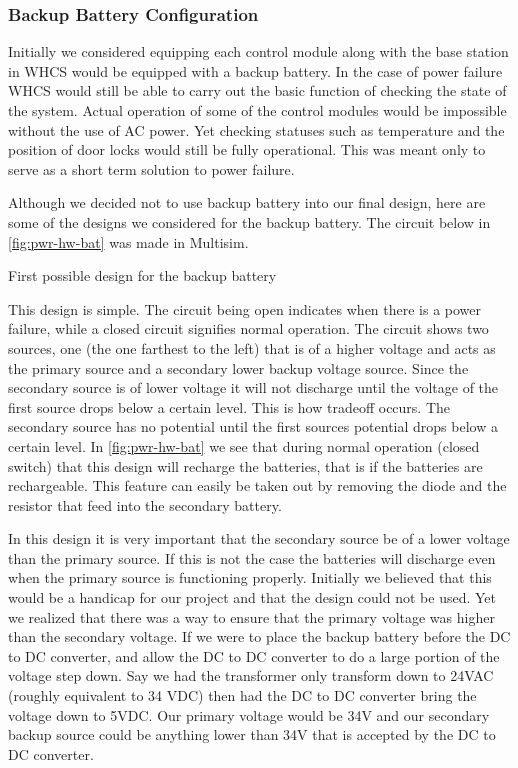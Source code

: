 \subsubsection{Backup Battery Configuration}
Initially we considered equipping each control module along with the base station in WHCS would be equipped with a
backup battery. In the case of power failure WHCS would still be able to carry
out the basic function of checking the state of the system. Actual operation of
some of the control modules would be impossible without the use of AC power. Yet
checking statuses such as temperature and the position of door locks would still
be fully operational. This was meant only to serve as a short term solution to
power failure.

Although we decided not to use backup battery into our final design, here are some of the designs we considered for the backup battery. The
circuit below in \autoref{fig:pwr-hw-bat} was made in Multisim.
\cite{link4}

{First possible design for the backup battery}

This design is simple. The circuit being open indicates when there is a power
failure, while a closed circuit signifies normal operation. The circuit shows
two sources, one (the one farthest to the left) that is of a higher voltage and
acts as the primary source and a secondary lower backup voltage source. Since
the secondary source is of lower voltage it will not discharge until the
voltage of the first source drops below a certain level. This is how tradeoff
occurs.  The secondary source has no potential until the first sources
potential drops below a certain level. In \autoref{fig:pwr-hw-bat} we see that
during normal operation (closed switch) that this design will recharge the
batteries, that is if the batteries are rechargeable. This feature can easily
be taken out by removing the diode and the resistor that feed into the
secondary battery.

In this design it is very important that the secondary source be of a lower
voltage than the primary source. If this is not the case the batteries will
discharge even when the primary source is functioning properly. Initially we
believed that this would be a handicap for our project and that the design could not be used. Yet we realized that there was a way to ensure that the
primary voltage was higher than the secondary voltage. If we were to place the
backup battery before the DC to DC converter, and allow the DC to DC converter
to do a large portion of the voltage step down.  Say we had the transformer
only transform down to 24VAC (roughly equivalent to 34 VDC) then had the DC to
DC converter bring the voltage down to 5VDC. Our primary voltage would be 34V
and our secondary backup source could be anything lower than 34V that is
accepted by the DC to DC converter.

